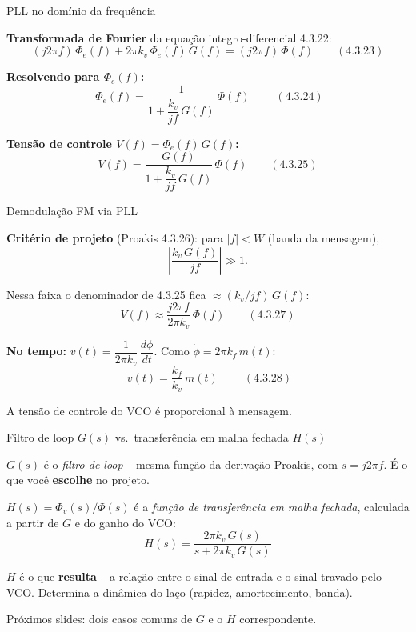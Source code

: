 
\begin{frame}{PLL no domínio da frequência}

\textbf{Transformada de Fourier} da equação integro-diferencial 4.3.22:
\[
(j2\pi f)\,\Phi_e(f) + 2\pi k_v\,\Phi_e(f)\,G(f) = (j2\pi f)\,\Phi(f) \qquad (\text{4.3.23})
\]

\pause
\textbf{Resolvendo para $\Phi_e(f)$:}
\[
\boxed{\;\Phi_e(f) = \frac{1}{1 + \dfrac{k_v}{jf}\,G(f)}\,\Phi(f)\;} \qquad (\text{4.3.24})
\]

\pause
\textbf{Tensão de controle $V(f) = \Phi_e(f)\,G(f)$:}
\[
V(f) = \frac{G(f)}{1 + \dfrac{k_v}{jf}\,G(f)}\,\Phi(f) \qquad (\text{4.3.25})
\]

\end{frame}


\begin{frame}{Demodulação FM via PLL}

\textbf{Critério de projeto} (Proakis 4.3.26): para $|f| < W$ (banda da mensagem),
\[
\left|\dfrac{k_v\,G(f)}{jf}\right| \gg 1.
\]

\pause
Nessa faixa o denominador de 4.3.25 fica $\approx (k_v/jf)\,G(f)$:
\[
V(f) \approx \dfrac{j2\pi f}{2\pi k_v}\,\Phi(f) \qquad (\text{4.3.27})
\]

\pause
\textbf{No tempo:} $v(t) = \dfrac{1}{2\pi k_v}\,\dfrac{d\phi}{dt}$. Como $\dot\phi = 2\pi k_f\,m(t)$:
\[
\boxed{\;v(t) = \dfrac{k_f}{k_v}\,m(t)\;} \qquad (\text{4.3.28})
\]

A tensão de controle do VCO é proporcional à mensagem.

\end{frame}


\begin{frame}{Filtro de loop $G(s)$ vs.\ transferência em malha fechada $H(s)$}

\textbf{$G(s)$} é o \emph{filtro de loop} -- mesma função da derivação Proakis, com $s = j2\pi f$. É o que você \textbf{escolhe} no projeto.

\pause
\vspace{0.3cm}
\textbf{$H(s) = \Phi_v(s)/\Phi(s)$} é a \emph{função de transferência em malha fechada}, calculada a partir de $G$ e do ganho do VCO:
\[
\boxed{\;H(s) = \frac{2\pi k_v\,G(s)}{s + 2\pi k_v\,G(s)}\;}
\]

\pause
\vspace{0.3cm}
$H$ é o que \textbf{resulta} -- a relação entre o sinal de entrada e o sinal travado pelo VCO. Determina a dinâmica do laço (rapidez, amortecimento, banda).

\vspace{0.3cm}
Próximos slides: dois casos comuns de $G$ e o $H$ correspondente.

\end{frame}

